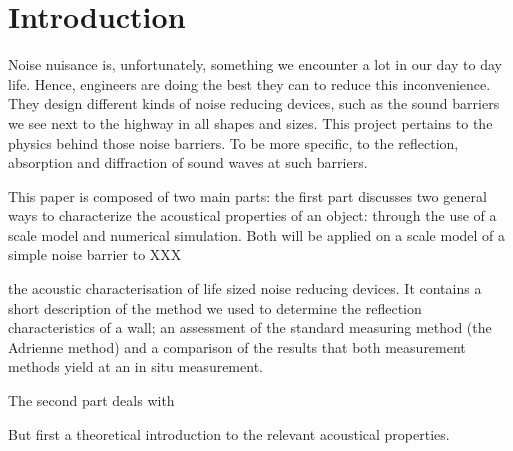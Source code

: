 \section{Introduction}
Noise nuisance is, unfortunately, something we encounter a lot in our day to day life. Hence, engineers are doing the best they can to reduce this inconvenience. They design different kinds of noise reducing devices, such as the sound barriers we see next to the highway in all shapes and sizes. 
This project pertains to the physics behind those noise barriers. To be more specific, to the reflection, absorption and diffraction of sound waves at such barriers.

This paper is composed of two main parts: the first part discusses two general ways to characterize the acoustical properties of an object: through the use of a scale model and numerical simulation. Both will be applied on a scale model of a simple noise barrier to XXX


the acoustic characterisation of life sized noise reducing devices. It contains a short description of the method we used to determine the reflection characteristics of a wall; an assessment of the standard measuring method (the Adrienne method) and a comparison of the results that both measurement methods yield at an in situ measurement.

The second part deals with 

But first a theoretical introduction to the relevant acoustical properties.
